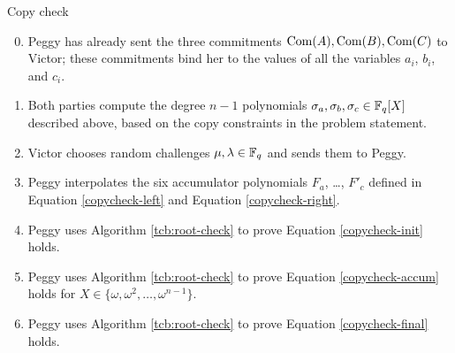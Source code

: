 \begin{algo}{Copy check}{}
\leavevmode
\begin{enumerate}
\setcounter{enumi}{-1}
\item
  Peggy has already sent the three commitments
  $\operatorname{Com}(A),\operatorname{Com}(B),\operatorname{Com}(C)$
  to Victor; these commitments bind her to the values of all the
  variables $a_{i}$, $b_{i}$, and $c_{i}$.
\item
  Both parties compute the degree $n - 1$ polynomials
  $\sigma_{a},\sigma_{b},\sigma_{c} \in \mathbb{F}_{q}[X]$
  described above, based on the copy constraints in the problem
  statement.
\item
  Victor chooses random challenges $\mu,\lambda \in \mathbb{F}_{q}$
  and sends them to Peggy.
\item
  Peggy interpolates the six accumulator polynomials $F_{a}$, \ldots,
  $F'_{c}$ defined in Equation \eqref{copycheck-left}
  and Equation \eqref{copycheck-right}.
\item
  Peggy uses Algorithm \ref{tcb:root-check} to prove
  Equation \eqref{copycheck-init} holds.
\item
  Peggy uses Algorithm \ref{tcb:root-check} to prove
  Equation \eqref{copycheck-accum} holds for
  $X \in \{ \omega,\omega^{2},\ldots,\omega^{n - 1} \}$.
\item
  Peggy uses Algorithm \ref{tcb:root-check} to prove
  Equation \eqref{copycheck-final} holds.
\end{enumerate}
\end{algo}
